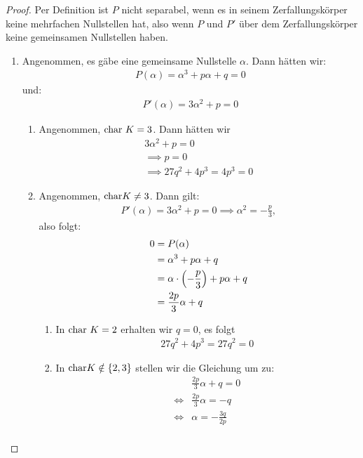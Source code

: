 \documentclass{article}
\begin{document}
		\begin{proof}
			Per Definition ist $P$ nicht separabel, wenn es in seinem Zerfallungskörper keine mehrfachen Nullstellen hat, also wenn $P$ und $P'$ über dem Zerfallungskörper keine gemeinsamen Nullstellen haben.
			\begin{enumerate}
				\item 
			Angenommen, es gäbe eine gemeinsame Nullstelle $\alpha$. Dann hätten wir:
			\begin{align*}
				P(\alpha) = \alpha^3 + p\alpha + q = 0
			\end{align*}
			und:
			\begin{align*}
				P'(\alpha) = 3\alpha^2 + p = 0
			\end{align*}
			\begin{enumerate}
				\item Angenommen, $\textnormal{char}~ K = 3$. Dann hätten wir
				\begin{align*}
					3\alpha^2 + p = 0\\ 
					\implies p = 0\\
					\implies 27q^2 + 4p^3 = 4p^3 = 0
				\end{align*}
				\item Angenommen, $\textnormal{char} K \neq 3$. Dann gilt:
				\begin{align*}
					 P'(\alpha) = 3\alpha^2 + p = 0 \implies \alpha^2 = -\frac{p}{3},
				\end{align*}
				also folgt:
				\begin{align*}
					0 &= P(\alpha)\\ 
					&= \alpha^3 + p\alpha + q\\
					&= \alpha \cdot \qty(-\frac{p}{3}) + p\alpha + q\\
					&= \frac{2p}{3}\alpha + q
				\end{align*}
				\begin{enumerate}
					\item In $\textnormal{char}~ K = 2$ erhalten wir $q = 0$, es folgt
					\begin{align*}
						27q^2 + 4p^3 = 27q^2 = 0
					\end{align*}
					\item
					In $\textnormal{char} K \notin \qty{2,3}$ stellen wir die Gleichung um zu:
					\begin{align*}
						&\frac{2p}{3}\alpha + q = 0\\
						\Leftrightarrow  &\frac{2p}{3}\alpha = -q\\
						\Leftrightarrow  &\alpha = -\frac{3q}{2p}\\

\end{align*}
\end{enumerate}
\end{enumerate}
\end{enumerate}
\end{proof}
\end{document}

